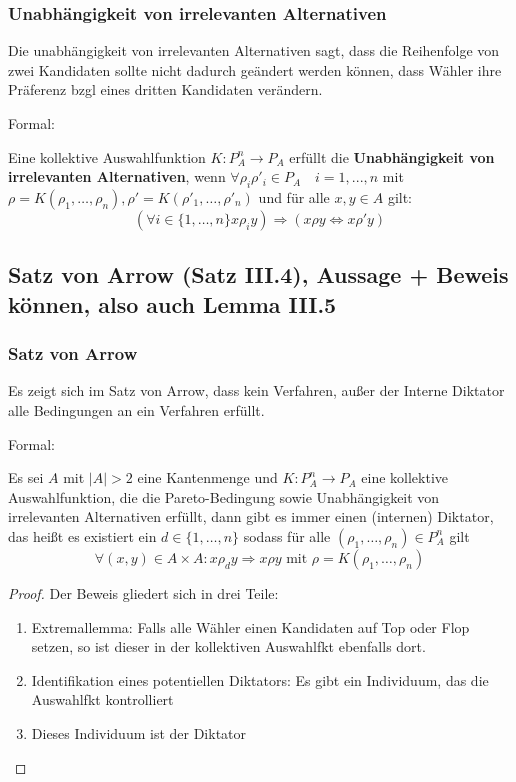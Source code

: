 \documentclass[]{article}
\begin{document}
\subsubsection*{Unabhängigkeit von irrelevanten Alternativen}
 Die unabhängigkeit von irrelevanten Alternativen sagt, dass die Reihenfolge von zwei Kandidaten sollte nicht dadurch geändert werden können, dass Wähler ihre Präferenz bzgl eines dritten Kandidaten verändern. 
 
 Formal:

Eine kollektive Auswahlfunktion $K : P_A^n \to P_A$ erfüllt die \textbf{Unabhängigkeit von irrelevanten Alternativen}, wenn
$\forall \rho_i \rho'_i \in P_A \quad i=1,...,n$ mit $\rho = K(\rho_1, \dots, \rho_n), \rho' = K(\rho'_1, \dots, \rho'_n)$ und für alle $x,y \in A$ gilt:
\begin{equation*}
\left( \forall i\in \{1, \dots, n\} x \rho_i y \right)
\Rightarrow \left( x \rho y \Leftrightarrow x \rho' y \right)
\end{equation*}

\subsection*{Satz von Arrow (Satz III.4), Aussage + Beweis können, also auch Lemma III.5}

\subsubsection*{Satz von Arrow}
Es zeigt sich im Satz von Arrow, dass kein Verfahren, außer der Interne Diktator alle Bedingungen an ein Verfahren erfüllt.

Formal: 

Es sei $A$ mit $|A| > 2$ eine Kantenmenge und $K: P_A^n \to P_A$ eine kollektive Auswahlfunktion, die die Pareto-Bedingung sowie Unabhängigkeit von irrelevanten Alternativen erfüllt, dann gibt es immer einen (internen) Diktator, das heißt es existiert ein $d \in \{1, \dots, n\}$ sodass für alle $(\rho_1, \dots, \rho_n) \in P_A^n$ gilt
\begin{equation*}
\forall (x,y) \in A \times A : x \rho_d y \Rightarrow x \rho y \text{ mit } \rho = K(\rho_1, \dots, \rho_n)
\end{equation*}
\begin{proof}
	Der Beweis gliedert sich in drei Teile:
	\begin{enumerate}
		\item Extremallemma: Falls alle Wähler einen Kandidaten auf Top oder Flop setzen, so ist dieser in der kollektiven Auswahlfkt ebenfalls dort.
		\item Identifikation eines potentiellen Diktators: Es gibt ein Individuum, das die Auswahlfkt kontrolliert
		\item Dieses Individuum ist der Diktator
	\end{enumerate}
\end{proof}
\end{document}
